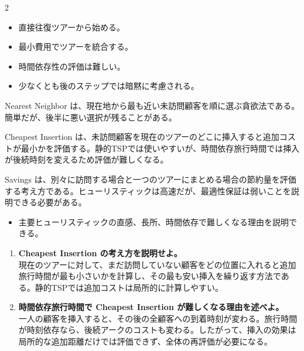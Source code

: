 \clearpage
{}
\begin{multicols}{2}\footnotesize\raggedcolumns
{}
\begin{itemize}
\item 直接往復ツアーから始める。
\item 最小費用でツアーを統合する。
\item 時間依存性の評価は難しい。
\item 少なくとも後のステップでは暗黙に考慮される。
\end{itemize}
Nearest Neighbor は、現在地から最も近い未訪問顧客を順に選ぶ貪欲法である。簡単だが、後半に悪い選択が残ることがある。\par

Cheapest Insertion は、未訪問顧客を現在のツアーのどこに挿入すると追加コストが最小かを評価する。静的TSPでは使いやすいが、時間依存旅行時間では挿入が後続時刻を変えるため評価が難しくなる。\par

Savings は、別々に訪問する場合と一つのツアーにまとめる場合の節約量を評価する考え方である。ヒューリスティックは高速だが、最適性保証は弱いことを説明できる必要がある。\par
{}
\begin{itemize}
\item 主要ヒューリスティックの直感、長所、時間依存で難しくなる理由を説明できる。
\end{itemize}
\begin{enumerate}
\item \textbf{Cheapest Insertion の考え方を説明せよ。}\\現在のツアーに対して、まだ訪問していない顧客をどの位置に入れると追加旅行時間が最も小さいかを計算し、その最も安い挿入を繰り返す方法である。静的TSPでは追加コストは局所的に計算しやすい。
\item \textbf{時間依存旅行時間で Cheapest Insertion が難しくなる理由を述べよ。}\\一人の顧客を挿入すると、その後の全顧客への到着時刻が変わる。旅行時間が時刻依存なら、後続アークのコストも変わる。したがって、挿入の効果は局所的な追加距離だけでは評価できず、全体の再評価が必要になる。
\end{enumerate}
\end{multicols}

